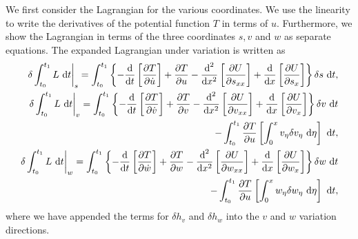 We first consider the Lagrangian for the various coordinates. We use the linearity to write the derivatives of the potential function $T$ in terms of $u$. Furthermore, we show the Lagrangian in terms of the three coordinates $s,v$ and $w$ as separate equations. The expanded Lagrangian under variation is written as
\begin{eqnarray}
\left.\delta\int_{t_0}^{t_1}L\text{ d}t\right|_s = \int_{t_0}^{t_1}\left\lbrace-\frac{\text d}{\text dt}\left[\frac{\partial T}{\partial \dot u}\right]+\frac{\partial T}{\partial u} - \frac{\text d^2}{\text dx^2}\left[\frac{\partial U}{\partial s_{xx}}\right]+\frac{\text d}{\text dx}\left[\frac{\partial  U}{\partial s_{x}}\right]\right\rbrace\delta s\text{ d}t,\\
\left.\delta\int_{t_0}^{t_1}L\text{ d}t\right|_v =\int_{t_0}^{t_1}\left\lbrace-\frac{\text d}{\text dt}\left[\frac{\partial T}{\partial \dot v}\right]+\frac{\partial T}{\partial v} - \frac{\text d^2}{\text dx^2}\left[\frac{\partial U}{\partial v_{xx}}\right]+\frac{\text d}{\text dx}\left[\frac{\partial  U}{\partial v_{x}}\right]\right\rbrace\delta v\text{ d}t\\
-\int_{t_0}^{t_1}\frac{\partial T}{\partial u}\left[\int_0^xv_{\eta}\delta v_{\eta}\text{ d}\eta\right]\text{ d}t,\nonumber\\
\left.\delta\int_{t_0}^{t_1}L\text{ d}t\right|_w =\int_{t_0}^{t_1}\left\lbrace-\frac{\text d}{\text dt}\left[\frac{\partial T}{\partial \dot w}\right]+\frac{\partial T}{\partial w} - \frac{\text d^2}{\text dx^2}\left[\frac{\partial U}{\partial w_{xx}}\right]+\frac{\text d}{\text dx}\left[\frac{\partial  U}{\partial w_{x}}\right]\right\rbrace\delta w\text{ d}t\\
-\int_{t_0}^{t_1}\frac{\partial T}{\partial u}\left[\int_0^xw_{\eta}\delta w_{\eta}\text{ d}\eta\right]\text{ d}t,\nonumber
\end{eqnarray}
where we have appended the terms for $\delta h_v$ and $\delta h_w$ into the $v$ and $w$ variation directions.

